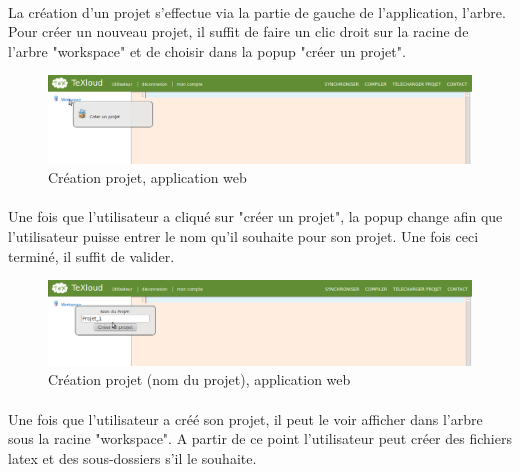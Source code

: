 \documentclass[a4paper,12pt]{article}
\begin{document}
\paragraph*{}
La création d'un projet s'effectue via la partie de gauche de l'application, l'arbre. Pour créer un nouveau projet, il suffit de faire un clic droit sur la racine de l'arbre "workspace" et de choisir dans la popup "créer un projet".

\begin{figure}[!ht]
\begin{center}
  \includegraphics[width=1\textwidth]{./images/screenshot/CreeProjet.png}
\end{center}
  \caption{Création projet, application web}
  \label{createProjectWeb}
\end{figure}

\paragraph*{}
Une fois que l'utilisateur a cliqué sur "créer un projet", la popup change afin que l'utilisateur puisse entrer le nom qu'il souhaite pour son projet. Une fois ceci terminé, il suffit de valider.

\begin{figure}[!ht]
\begin{center}
  \includegraphics[width=1\textwidth]{./images/screenshot/Suite_Creation_Projet.png}
\end{center}
  \caption{Création projet (nom du projet), application web}
  \label{suiteCreationProjet}
\end{figure}

\clearpage
\paragraph*{}
Une fois que l'utilisateur a créé son projet, il peut le voir afficher dans l'arbre sous la racine "workspace". A partir de ce point l'utilisateur peut créer des fichiers latex et des sous-dossiers s'il le souhaite.
\end{document}
